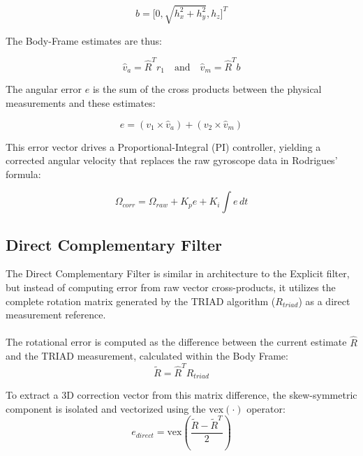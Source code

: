 \documentclass{article}
\begin{document}
\begin{equation}
   b = \bigg[0, \sqrt{h_x^2 + h_y^2}, h_z \bigg]^T 
\end{equation}

The Body-Frame estimates are thus:

\begin{equation}
   \hat{v}_a = \hat{R}^T r_1 \quad \text{and} \quad \hat{v}_m = \hat{R}^T b
\end{equation}

The angular error $e$ is the sum of the cross products between the physical measurements and these estimates:

\begin{equation}
    e = (v_1 \times \hat{v}_a) + (v_2 \times \hat{v}_m)
\end{equation}

This error vector drives a Proportional-Integral (PI) controller, yielding a corrected angular velocity that replaces the raw gyroscope data in Rodrigues' formula:

\begin{equation}
    \Omega_{corr} = \Omega_{raw} + K_p e + K_i \int e \, dt
\end{equation}

\subsection{Direct Complementary Filter}

The Direct Complementary Filter is similar in architecture to the Explicit filter, but instead of computing error from raw vector cross-products, it utilizes the complete rotation matrix generated by the TRIAD algorithm ($R_{triad}$) as a direct measurement reference.\\
\\
The rotational error is computed as the difference between the current estimate $\hat{R}$ and the TRIAD measurement, calculated within the Body Frame:
\begin{equation}
\tilde{R} = \hat{R}^T R_{triad}
\end{equation}

To extract a 3D correction vector from this matrix difference, the skew-symmetric component is isolated and vectorized using the $\text{vex}(\cdot)$ operator:
\begin{equation}
e_{direct} = \text{vex} \left( \frac{\tilde{R} - \tilde{R}^T}{2} \right)
\end{equation}
\end{document}
